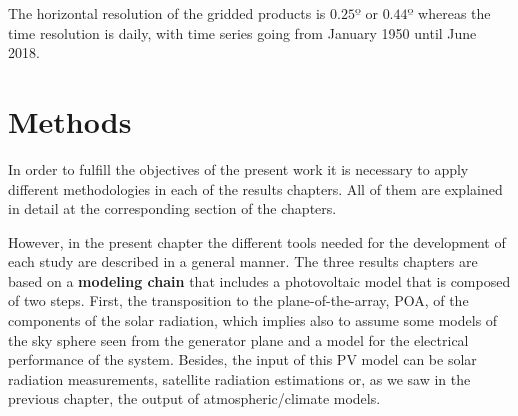The horizontal resolution of the gridded products is $0.25º$ or $0.44º$ whereas the time resolution is daily, with time series going from January 1950 until June 2018.  



\chapter{Methods\label{cha:methods}}

In order to fulfill the objectives of the present work it is necessary to apply different methodologies in each of the results chapters. All of them are explained in detail at the corresponding section of the chapters. %

However, in the present chapter the different tools needed for the development of each study are described in a general manner. The three results chapters are based on a \textbf{modeling chain} that includes a photovoltaic model that is composed of two steps. First, the transposition to the plane-of-the-array, POA, of the components of the solar radiation, which implies also to assume some models of the sky sphere seen from the generator plane and a model for the electrical performance of the system. Besides, the input of this PV model can be solar radiation measurements, satellite radiation estimations or, as we saw in the previous chapter, the output of atmospheric/climate models. 


